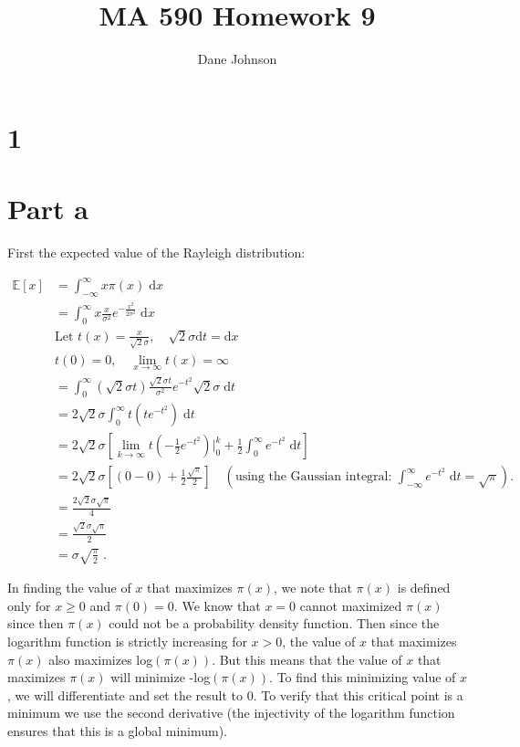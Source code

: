\documentclass[11pt]{article}
\title{MA 590 Homework 9}
\author{Dane Johnson}
\begin{document}
\maketitle

\section*{1}

\section*{Part a}

First the expected value of the Rayleigh distribution:

\begin{align*}
\mathbb{E}[x] &= \int_{-\infty}^{\infty} x\pi(x) \;\text{d}x\\
&= \int_{0}^{\infty} x \frac{x}{\sigma^2}e^{-\frac{x^2}{2\sigma^2}} \;\text{d}x\\
&\text{Let } t(x) = \frac{x}{\sqrt{2}\sigma}, \quad \sqrt{2}\sigma \text{d}t = \text{d}x\\
&t(0) = 0, \quad \lim_{x \rightarrow \infty} t(x) = \infty \\
&= \int_{0}^{\infty} (\sqrt{2}\sigma t)\frac{\sqrt{2}\sigma t}{\sigma^2}e^{-t^2} \sqrt{2}\sigma\;\text{d}t \\
&= 2\sqrt{2}\sigma\int_{0}^{\infty} t\left(te^{-t^2}\right) \;\text{d}t\\
&=2\sqrt{2}\sigma\left[\lim_{k\rightarrow \infty} t\left(-\frac{1}{2}e^{-t^2}\right)\Big|_{0}^k + \frac{1}{2}\int_{0}^{\infty} e^{-t^2} \;\text{d}t \right]\\
&=2\sqrt{2}\sigma\left[(0 - 0)  + \frac{1}{2}\frac{\sqrt{\pi}}{2} \right] \quad \left(\text{using the Gaussian integral: }\int_{-\infty}^{\infty} e^{-t^2} \;\text{d}t = \sqrt{\pi}\right).\\
&= \frac{2\sqrt{2}\sigma\sqrt{\pi}}{4}\\
&= \frac{\sqrt{2}\sigma\sqrt{\pi}}{2} \\
&= \sigma\sqrt{\frac{\pi}{2}} \;.
\end{align*}

In finding the value of $x$ that maximizes $\pi(x)$, we note that $\pi(x)$ is defined only for $x\geq 0$ and $\pi(0) = 0$. We know that $x=0$ cannot maximized $\pi(x)$ since then $\pi(x)$ could not be a probability density function. Then since the logarithm function is strictly increasing for $x>0$, the value of $x$ that maximizes $\pi(x)$ also maximizes log$(\pi(x))$. But this means that the value of $x$ that maximizes $\pi(x)$ will minimize -log$(\pi(x))$. To find this minimizing value of $x$, we will differentiate and set the result to 0. To verify that this critical point is a minimum we use the second derivative (the injectivity of the logarithm function ensures that this is a global minimum). 
\end{document}
